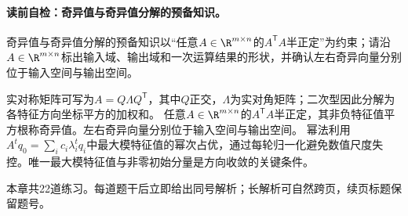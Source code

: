 \paragraph{读前自检：奇异值与奇异值分解的预备知识。}奇异值与奇异值分解的预备知识以“任意$A\in\R^{m\times n}$的$A^{\mathsf T}A$半正定”为约束；请沿$A\in\R^{m\times n}$标出输入域、输出域和一次运算结果的形状，并确认左右奇异向量分别位于输入空间与输出空间。\par

实对称矩阵可写为$A=Q\Lambda Q^{\mathsf T}$，其中$Q$正交，$\Lambda$为实对角矩阵；二次型因此分解为各特征方向坐标平方的加权和。
任意$A\in\R^{m\times n}$的$A^{\mathsf T}A$半正定，其非负特征值平方根称奇异值。左右奇异向量分别位于输入空间与输出空间。
幂法利用$A^tq_0=\sum_i c_i\lambda_i^tq_i$中最大模特征值的幂次占优，通过每轮归一化避免数值尺度失控。唯一最大模特征值与非零初始分量是方向收敛的关键条件。


\begin{chapterexercisebox}
\label{schema:V1-C02:CH-34}
\label{schema:V1-C02:CH-35}
本章共22道练习。每道题干后立即给出同号解析；长解析可自然跨页，续页标题保留题号。
\end{chapterexercisebox}

